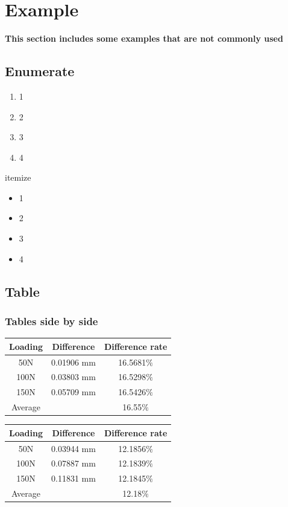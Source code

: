 \section{Example}
\label{sec:Example}
\textbf{This section includes some examples that are not commonly used}
\subsection{Enumerate}
\begin{enumerate}
	\item 1
	\item 2
	\item 3
	\item 4
\end{enumerate}
itemize
\begin{itemize}
	\item 1
	\item 2
	\item 3
	\item 4
\end{itemize}
\newpage


\subsection{Table}

\subsubsection{Tables side by side}
\begin{minipage}[c]{0.5\textwidth}
	\label{T 4.1}
	\centering
	\begin{tabular}{@{}ccc@{}}
		\toprule
		Loading & Difference & Difference rate \\ \midrule
		50N     & 0.01906 mm & 16.5681$\%$     \\
		100N    & 0.03803 mm & 16.5298$\%$     \\
		150N    & 0.05709 mm & 16.5426$\%$     \\ \midrule
		Average &            & 16.55$\%$           \\ \bottomrule
	\end{tabular}
\end{minipage}
\begin{minipage}[c]{0.5\textwidth}
	\label{T 4.2}
	\centering
	\begin{tabular}{@{}ccc@{}}
		\toprule
		Loading & Difference & Difference rate \\ \midrule
		50N     & 0.03944 mm & 12.1856$\%$     \\
		100N    & 0.07887 mm & 12.1839$\%$     \\
		150N    & 0.11831 mm & 12.1845$\%$     \\ \midrule
		Average &            & 12.18$\%$           \\ \bottomrule
	\end{tabular}
\end{minipage}

